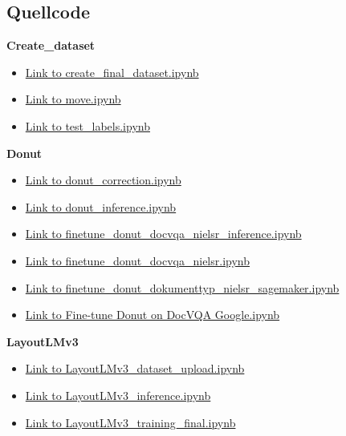 \documentclass[12pt,a4paper,twoside]{article}
\begin{document}
\subsection{Quellcode}
\textbf{Create\_dataset}
\begin{itemize}
    \item \href{https://github.com/Flashness123/Bachelorarbeit/blob/main/create_dataset/create_final_dataset.ipynb}{Link to create\_final\_dataset.ipynb}
    \item \href{https://github.com/Flashness123/Bachelorarbeit/blob/main/create_dataset/move.ipynb}{Link to move.ipynb}
    \item \href{https://github.com/Flashness123/Bachelorarbeit/blob/main/create_dataset/test_labels.ipynb}{Link to test\_labels.ipynb}
\end{itemize}

\textbf{Donut}
\begin{itemize}
    \item \href{https://github.com/Flashness123/Bachelorarbeit/blob/main/donut/donut_correction.ipynb}{Link to donut\_correction.ipynb}
    \item \href{https://github.com/Flashness123/Bachelorarbeit/blob/main/donut/donut_inference.ipynb}{Link to donut\_inference.ipynb}
    \item \href{https://github.com/Flashness123/Bachelorarbeit/blob/main/donut/finetune_donut_docvqa_nielsr_inference.ipynb}{Link to finetune\_donut\_docvqa\_nielsr\_inference.ipynb}
    \item \href{https://github.com/Flashness123/Bachelorarbeit/blob/main/donut/finetune_donut_docvqa_nielsr.ipynb}{Link to finetune\_donut\_docvqa\_nielsr.ipynb}
    \item \href{https://github.com/Flashness123/Bachelorarbeit/blob/main/donut/finetune_donut_dokumenttyp_nielsr_sagemaker.ipynb}{Link to finetune\_donut\_dokumenttyp\_nielsr\_sagemaker.ipynb}
    \item \href{https://github.com/Flashness123/Bachelorarbeit/blob/main/donut/Fine-tune Donut on DocVQA Google.ipynb}{Link to Fine-tune Donut on DocVQA Google.ipynb}
\end{itemize}

\textbf{LayoutLMv3}
\begin{itemize}
    \item \href{https://github.com/Flashness123/Bachelorarbeit/blob/main/layoutlmv3/LayoutLMv3_dataset_upload.ipynb}{Link to LayoutLMv3\_dataset\_upload.ipynb}
    \item \href{https://github.com/Flashness123/Bachelorarbeit/blob/main/layoutlmv3/LayoutLMv3_inference.ipynb}{Link to LayoutLMv3\_inference.ipynb}
    \item \href{https://github.com/Flashness123/Bachelorarbeit/blob/main/layoutlmv3/LayoutLMv3_training_final.ipynb}{Link to LayoutLMv3\_training\_final.ipynb}
\end{itemize}
\end{document}
